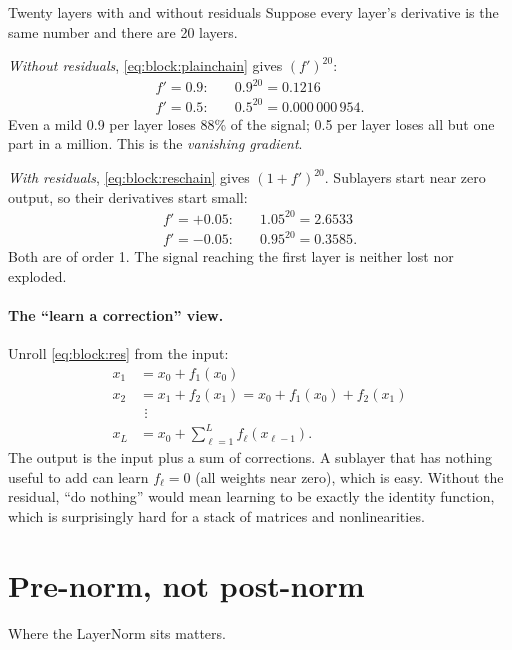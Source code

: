 \begin{worked}[label={we:block:resnumbers}]{Twenty layers with and without residuals}
Suppose every layer's derivative is the same number and there are 20 layers.

\emph{Without residuals}, \cref{eq:block:plainchain} gives $(f')^{20}$:
\begin{align*}
  f' = 0.9:&\quad 0.9^{20} = 0.1216\\
  f' = 0.5:&\quad 0.5^{20} = 0.000\,000\,954 .
\end{align*}
Even a mild 0.9 per layer loses 88\% of the signal; 0.5 per layer loses all but one part in a
million. This is the \emph{vanishing gradient}.

\emph{With residuals}, \cref{eq:block:reschain} gives $(1 + f')^{20}$. Sublayers start near zero
output, so their derivatives start small:
\begin{align*}
  f' = +0.05:&\quad 1.05^{20} = 2.6533\\
  f' = -0.05:&\quad 0.95^{20} = 0.3585 .
\end{align*}
Both are of order 1. The signal reaching the first layer is neither lost nor exploded.
\end{worked}

\paragraph{The ``learn a correction'' view.} Unroll \cref{eq:block:res} from the input:
\begin{align*}
  x_1 &= x_0 + f_1(x_0)\\
  x_2 &= x_1 + f_2(x_1) = x_0 + f_1(x_0) + f_2(x_1)\\
  &\ \,\vdots\\
  x_L &= x_0 + \sum_{\ell=1}^{L} f_\ell(x_{\ell-1}) .
\end{align*}
The output is the input plus a sum of corrections. A sublayer that has nothing useful to add can
learn $f_\ell = 0$ (all weights near zero), which is easy. Without the residual, ``do nothing''
would mean learning to be exactly the identity function, which is surprisingly hard for a stack of
matrices and nonlinearities.

\section{Pre-norm, not post-norm}\label{sec:block:prenorm}

Where the LayerNorm sits matters.

